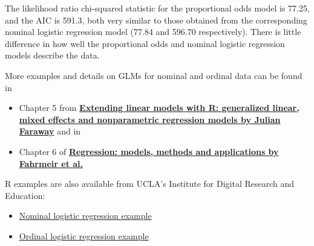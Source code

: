 \documentclass[
  letterpaper,
  DIV=11,
  numbers=noendperiod]{scrartcl}
\begin{document}
The likelihood ratio chi-squared statistic for the proportional odds
model is 77.25, and the AIC is 591.3, both very similar to those
obtained from the corresponding nominal logistic regression model (77.84
and 596.70 respectively). There is little difference in how well the
proportional odds and nominal logistic regression models describe the
data.

More examples and details on GLMs for nominal and ordinal data can be
found in

\begin{itemize}
\item
  Chapter 5 from
  \href{http://encore.lib.gla.ac.uk/iii/encore/record/C__Rb2939999}{\textbf{Extending
  linear models with R: generalized linear, mixed effects and
  nonparametric regression models by Julian Faraway}} and in
\item
  Chapter 6 of
  \href{http://encore.lib.gla.ac.uk/iii/encore/record/C__Rb2991222}{\textbf{Regression:
  models, methods and applications by Fahrmeir et al.}}
\end{itemize}

R examples are also available from UCLA's Institute for Digital Research
and Education:

\begin{itemize}
\item
  \href{https://stats.idre.ucla.edu/r/dae/multinomial-logistic-regression/}{Nominal
  logistic regression example}
\item
  \href{https://stats.idre.ucla.edu/r/dae/ordinal-logistic-regression/}{Ordinal
  logistic regression example}
\end{itemize}
\end{document}
